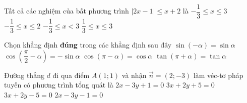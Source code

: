  \begin{ex}%
Tất cả các nghiệm của bất phương trình $|2x-1|\le x+2$ là
\choice
{\True $-\dfrac{1}{3}\le x\le 3$}	{$-\dfrac{1}{3}\le x\le 2$}	
{$-\dfrac{1}{3}\le x< 3$}		{$\dfrac{1}{3}\le x\le 3$}	
	
\end{ex}
 \begin{ex}%
Chọn khẳng định \textbf{đúng}	trong các khẳng định sau đây
\choice
{$\sin (-\alpha)=\sin \alpha$}	{$\cos \left(\dfrac{\pi}{2}-\alpha\right)=-\sin \alpha$}
{$\cos (\pi-\alpha)=\cos \alpha$}
{\True $\tan (\pi+\alpha)=\tan \alpha$}
	
\end{ex}
 \begin{ex}%
Đường thẳng $d$ đi qua điểm $A(1;1)$ và nhận $\vec{n}=(2;-3)$ làm véc-tơ pháp tuyến có phương trình tổng quát là
\choice
{\True $2x-3y+1=0$}		{$3x+2y+5=0$}	{$3x+2y-5=0$}	{$2x-3y-1=0$}
	
\end{ex}

